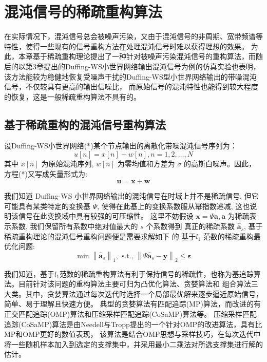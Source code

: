 \chapter{混沌信号的稀疏重构算法}
在实际情况下，混沌信号总会被噪声污染，又由于混沌信号的非周期、宽带频谱等特性，使得一些现有的信号重构方法在处理混沌信号时难以获得理想的效果。
为此，本章基于稀疏重构理论提出了一种针对被噪声污染混沌信号的重构算法，而随后的以第3章提出的Duffing-WS小世界网络输出混沌信号为例的仿真实验也表明，该方法能较为稳健地恢复受噪声干扰的Duffing-WS型小世界网络输出的带噪混沌信号，不仅较具有更高的输出信噪比， 而原始信号的混沌特性也能得到较大程度的恢复，这是一般稀疏重构算法不具有的。

\section{基于稀疏重构的混沌信号重构算法}
设Duffing-WS小世界网络(*)某个节点输出的离散化带噪混沌信号序列为：
\begin{equation}
    u[n]=x[n]+w[n], n=1,2, \ldots, N
\end{equation}
其中 $x[n]$ 为原始混沌序列, $w[n]$ 为零均值和方差为 $\sigma$ 的高斯白噪声。因此，方程(*)又写成矢量形式为:
\begin{equation}
    \boldsymbol{u}=\boldsymbol{x}+\boldsymbol{w}
\end{equation}

我们知道 Duffing-WS 小世界网络输出的混沌信号在时域上并不是稀疏信号,
但它可能具有某类特定的变换基 $\Psi$, 使得在此基上的变换系数服从幂指数递减,
这也说明该信号在此变换域中具有较强的可压缩性。
这里不妨假设 $\boldsymbol{x}=\Psi \boldsymbol{a}, \boldsymbol{a}$ 为稀疏表示系数,
我们保留所有系数中绝对值最大的 $s$ 个系数得到 真正的稀疏系数 $\hat{\boldsymbol{a}}_s$,
基于稀疏重构理论的混沌信号重构问题便是需要求解如下 的 基于$l_1$ 范数的稀疏重构最优化问题:
\begin{equation}
    \min \left\|\hat{\boldsymbol{a}}_s\right\|_1, \text { s.t., }\left\|\Psi \hat{\boldsymbol{a}}_s-\boldsymbol{y}\right\|_2 \leq \boldsymbol{\varepsilon}
\end{equation}\par
我们知道，基于$l_1$范数的稀疏重构算法有利于保持信号的稀疏性，也称为基追踪算法。目前针对该问题的重构算法主要可归为凸优化算法、贪婪算法和
组合算法三大类。其中，贪婪算法通过每次迭代时选择一个局部最优解来逐步逼近原始信号，简单、易于理解且快速方便。
典型的贪婪算法有匹配追踪(MP)算法，而改进的有正交匹配追踪(OMP)算法和压缩采样匹配追踪(CoSaMP)算法等。
压缩采样匹配追踪(CoSaMP)算法是由Needell与Tropp提出的一个针对OMP的改进算法，具有比MP和OMP更好的数值表现，
该算法是结合OMP思想与采样技巧，在每次迭代中将一些随机样本加入到选定的支撑集中，并采用最小二乘法对所选支撑集进行解的估计。

